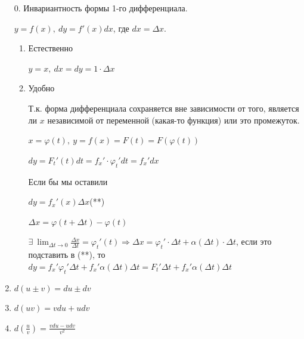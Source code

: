 \documentclass{article}
\begin{document}
    \begin{enumerate}
        \item[\(0\).] Инвариантность формы 1-го дифференциала.
        
        \( y = f(x),\ dy = f'(x)dx \), где \( dx = \Delta x \).

        \begin{enumerate}
            \item Естественно
            
            \( y = x,\ dx = dy = 1\cdot \Delta x \)
            
            \item Удобно 
            
            Т.к. форма дифференциала сохраняется вне зависимости от того, является ли \(x\) независимой от переменной (какая-то функция) или это промежуток.

            \( x = \varphi(t),\ y = f(x) = F(t) = F(\varphi(t)) \)

            \( dy = F_t'(t)dt = f_x' \cdot \varphi_t'dt = f_x'dx \)

            Если бы мы оставили 

            \( dy = f_x'(x)\Delta x \)(**)

            \( \Delta x = \varphi(t + \Delta t) - \varphi(t) \)

            \( \exists\ \lim_{\Delta t \to 0}\frac{\Delta x}{\Delta t} = \varphi_t'(t) \Rightarrow \Delta x = \varphi_t' \cdot \Delta t + \alpha(\Delta t)\cdot\Delta t \), если это подставить в (**), то \( dy = f_x'\varphi_t'\Delta t + f_x'\alpha(\Delta t)\Delta t = F_t'\Delta t + f_x'\alpha(\Delta t)\Delta t \)

        \end{enumerate}

        \item \( d(u \pm v) = du \pm dv \)
        \item \( d(uv) = vdu + udv \) 
        \item \( d(\frac{u}{v}) = \frac{vdu - udv}{v^2} \)


    \end{enumerate}
\end{document}
